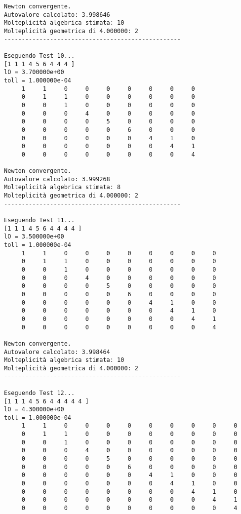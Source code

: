\documentclass[12pt]{article}
\begin{document}
\begin{verbatim}
Newton convergente.
Autovalore calcolato: 3.998646
Molteplicità algebrica stimata: 10
Molteplicità geometrica di 4.000000: 2
--------------------------------------------------

Eseguendo Test 10...
[1 1 1 4 5 6 4 4 4 ]
lO = 3.700000e+00
toll = 1.000000e-04
     1     1     0     0     0     0     0     0     0
     0     1     1     0     0     0     0     0     0
     0     0     1     0     0     0     0     0     0
     0     0     0     4     0     0     0     0     0
     0     0     0     0     5     0     0     0     0
     0     0     0     0     0     6     0     0     0
     0     0     0     0     0     0     4     1     0
     0     0     0     0     0     0     0     4     1
     0     0     0     0     0     0     0     0     4

Newton convergente.
Autovalore calcolato: 3.999268
Molteplicità algebrica stimata: 8
Molteplicità geometrica di 4.000000: 2
--------------------------------------------------

Eseguendo Test 11...
[1 1 1 4 5 6 4 4 4 4 ]
lO = 3.500000e+00
toll = 1.000000e-04
     1     1     0     0     0     0     0     0     0     0
     0     1     1     0     0     0     0     0     0     0
     0     0     1     0     0     0     0     0     0     0
     0     0     0     4     0     0     0     0     0     0
     0     0     0     0     5     0     0     0     0     0
     0     0     0     0     0     6     0     0     0     0
     0     0     0     0     0     0     4     1     0     0
     0     0     0     0     0     0     0     4     1     0
     0     0     0     0     0     0     0     0     4     1
     0     0     0     0     0     0     0     0     0     4

Newton convergente.
Autovalore calcolato: 3.998464
Molteplicità algebrica stimata: 10
Molteplicità geometrica di 4.000000: 2
--------------------------------------------------

Eseguendo Test 12...
[1 1 1 4 5 6 4 4 4 4 4 ]
lO = 4.300000e+00
toll = 1.000000e-04
     1     1     0     0     0     0     0     0     0     0     0
     0     1     1     0     0     0     0     0     0     0     0
     0     0     1     0     0     0     0     0     0     0     0
     0     0     0     4     0     0     0     0     0     0     0
     0     0     0     0     5     0     0     0     0     0     0
     0     0     0     0     0     6     0     0     0     0     0
     0     0     0     0     0     0     4     1     0     0     0
     0     0     0     0     0     0     0     4     1     0     0
     0     0     0     0     0     0     0     0     4     1     0
     0     0     0     0     0     0     0     0     0     4     1
     0     0     0     0     0     0     0     0     0     0     4


\end{verbatim}
\end{document}
